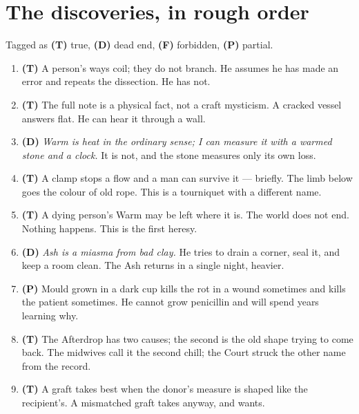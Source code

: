 \documentclass{design/chronicle}
\begin{document}
\section*{The discoveries, in rough order}

Tagged as \textbf{(T)} true, \textbf{(D)} dead end, \textbf{(F)} forbidden, \textbf{(P)} partial.

\begin{enumerate}[leftmargin=1.4em,itemsep=1pt,topsep=3pt,parsep=0pt]

\item \textbf{(T)} A person’s ways coil; they do not branch. He assumes he has made an error and repeats the dissection. He has not.

\item \textbf{(T)} The full note is a physical fact, not a craft mysticism. A cracked vessel answers flat. He can hear it through a wall.

\item \textbf{(D)} \emph{Warm is heat in the ordinary sense; I can measure it with a warmed stone and a clock.} It is not, and the stone measures only its own loss.

\item \textbf{(T)} A clamp stops a flow and a man can survive it — briefly. The limb below goes the colour of old rope. This is a tourniquet with a different name.

\item \textbf{(T)} A dying person’s Warm may be left where it is. The world does not end. Nothing happens. This is the first heresy.

\item \textbf{(D)} \emph{Ash is a miasma from bad clay.} He tries to drain a corner, seal it, and keep a room clean. The Ash returns in a single night, heavier.

\item \textbf{(P)} Mould grown in a dark cup kills the rot in a wound sometimes and kills the patient sometimes. He cannot grow penicillin and will spend years learning why.

\item \textbf{(T)} The Afterdrop has two causes; the second is the old shape trying to come back. The midwives call it the second chill; the Court struck the other name from the record.

\item \textbf{(T)} A graft takes best when the donor’s measure is shaped like the recipient’s. A mismatched graft takes anyway, and wants.


\end{enumerate}
\end{document}
